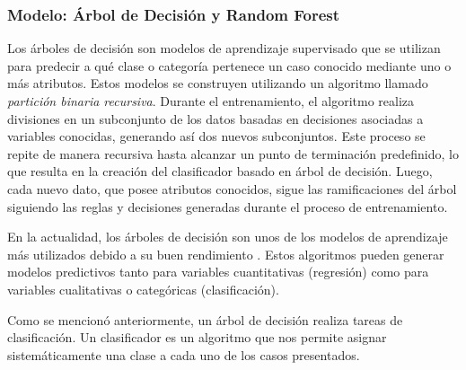 \subsubsection{Modelo: Árbol de Decisión y Random Forest}
Los árboles de decisión son modelos de aprendizaje supervisado que se utilizan para predecir a qué clase o categoría pertenece un caso conocido mediante uno o más atributos. Estos modelos se construyen utilizando un algoritmo llamado \emph{partición binaria recursiva}. Durante el entrenamiento, el algoritmo realiza divisiones en un subconjunto de los datos basadas en decisiones asociadas a variables conocidas, generando así dos nuevos subconjuntos. Este proceso se repite de manera recursiva hasta alcanzar un punto de terminación predefinido, lo que resulta en la creación del clasificador basado en árbol de decisión. Luego, cada nuevo dato, que posee atributos conocidos, sigue las ramificaciones del árbol siguiendo las reglas y decisiones generadas durante el proceso de entrenamiento.

En la actualidad, los árboles de decisión son unos de los modelos de aprendizaje más utilizados debido a su buen rendimiento \cite{arboles-decision}. Estos algoritmos pueden generar modelos predictivos tanto para variables cuantitativas (regresión) como para variables cualitativas o categóricas (clasificación).

Como se mencionó anteriormente, un árbol de decisión realiza tareas de clasificación. Un clasificador es un algoritmo que nos permite asignar sistemáticamente una clase a cada uno de los casos presentados.

